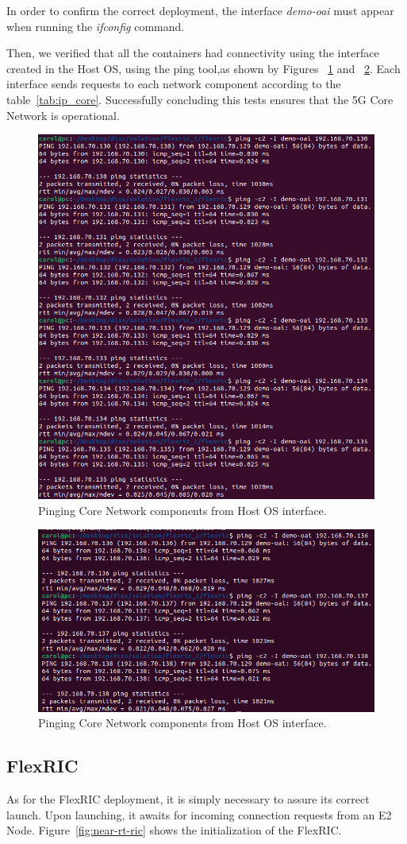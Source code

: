In order to confirm the correct deployment, the interface \textit{demo-oai} must appear when running the \textit{ifconfig} command.

Then, we verified that all the containers had connectivity using the interface created in the Host OS, using the ping tool,as shown by Figures ~\ref{fig:ping_core1} and ~\ref{fig:ping_core2}.
Each interface sends requests to each network component according to the table~\ref{tab:ip_core}.
Successfully concluding this tests ensures that the 5G Core Network is operational.

\begin{figure}[H]
\centering
\includegraphics[width=0.5\linewidth]{figures/ping_core_1}
\caption[Pinging Core Network components from Host OS
interface]{Pinging Core Network components from Host OS
interface.}
\label{fig:ping_core1}
\end{figure}

\begin{figure}[H]
    \centering
    \includegraphics[width=0.5\linewidth]{figures/ping_core_2}
    \caption[Pinging Core Network components from Host OS
    interface]{Pinging Core Network components from Host OS
    interface.}
    \label{fig:ping_core2}
\end{figure}




\subsection{FlexRIC}\label{subsec:flexric2}
As for the FlexRIC deployment, it is simply necessary to assure its correct launch.
Upon launching, it awaits for incoming connection requests from an E2 Node.
Figure~\ref{fig:near-rt-ric} shows the initialization of the FlexRIC\@.

